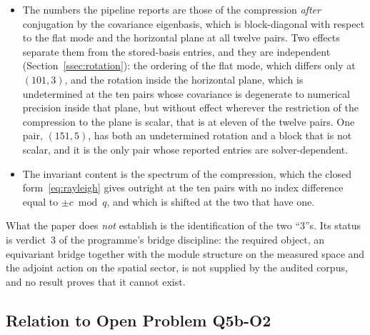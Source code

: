 \documentclass[11pt,a4paper]{article}
\begin{document}
\begin{itemize}
      Fourier mode, with an off-diagonal entry exactly when two stored indices differ by
      $\pm c \bmod q$ (Section~\ref{ssec:rayleigh}, diagnostic in
      Section~\ref{ssec:diagnostic}). In particular the difference between the two distinct
      entries is the identity~\eqref{eq:gap}.
      \item The numbers the pipeline reports are those of the compression \emph{after} conjugation
      by the covariance eigenbasis, which is block-diagonal with respect to the flat mode and the
      horizontal plane at all twelve pairs. Two effects separate them from the stored-basis
      entries, and they are independent (Section~\ref{ssec:rotation}): the ordering of the flat
      mode, which differs only at $(101,3)$, and the rotation inside the horizontal plane, which is
      undetermined at the ten pairs whose covariance is degenerate to numerical precision inside
      that plane, but without effect wherever the restriction of the compression to the plane is
      scalar, that is at eleven of the twelve pairs. One pair, $(151,5)$, has both an undetermined
      rotation and a block that is not scalar, and it is the only pair whose reported entries are
      solver-dependent.
      \item The invariant content is the spectrum of the compression, which the closed
      form~\eqref{eq:rayleigh} gives outright at the ten pairs with no index difference equal to
      $\pm c \bmod q$, and which is shifted at the two that have one.
    \end{itemize}

    \noindent
    What the paper does \emph{not} establish is the identification of the two ``3''s.
    Its status is verdict~3 of the programme's bridge discipline: the required object, an
    equivariant bridge together with the module structure on the measured space and the adjoint
    action on the spatial sector, is not supplied by the audited corpus, and no result proves that
    it cannot exist.

  \subsection{Relation to Open Problem Q5b-O2}
\end{document}
